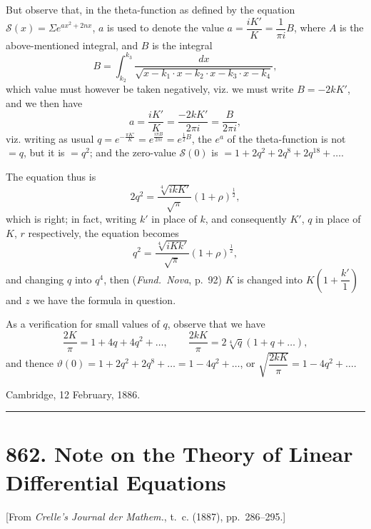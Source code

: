 \documentclass[11pt,a4paper]{article}
\theoremstyle{definition}
\begin{document}
But observe that, in the theta-function as defined by the equation $\mathcal{S}(x) = \Sigma e^{ax^2 + 2nx}$, $a$ is used to denote the value $a = \dfrac{iK'}{K} = \dfrac{1}{\pi i}B$, where $A$ is the above-mentioned integral, and $B$ is the integral
\[
B = \int_{k_2}^{k_3} \frac{dx}{\sqrt{x - k_1 \cdot x - k_2 \cdot x - k_3 \cdot x - k_4}},
\]
which value must however be taken negatively, viz. we must write $B = -2kK'$, and we then have
\[
a = \frac{iK'}{K} = \frac{-2kK'}{2\pi i} = \frac{B}{2\pi i},
\]
viz. writing as usual $q = e^{-\frac{\pi K'}{K}} = e^{\frac{i\pi B}{2\pi i}} = e^{\frac{1}{2}B}$, the $e^a$ of the theta-function is not $= q$, but it is $= q^2$; and the zero-value $\mathcal{S}(0)$ is $= 1 + 2q^2 + 2q^8 + 2q^{18} + \ldots$.

The equation thus is
\[
2q^2 = \frac{\sqrt[4]{ikK'}}{\sqrt{\pi}} (1 + \rho)^{\frac{1}{2}},
\]
which is right; in fact, writing $k'$ in place of $k$, and consequently $K'$, $q$ in place of $K$, $r$ respectively, the equation becomes
\[
q^2 = \frac{\sqrt[4]{iKk'}}{\sqrt{\pi}} (1 + \rho)^{\frac{1}{2}},
\]
and changing $q$ into $q^4$, then (\textit{Fund.~Nova}, p.~92) $K$ is changed into $K\left(1 + \dfrac{k'}{1}\right)$ and $z$ we have the formula in question.

As a verification for small values of $q$, observe that we have
\[
\frac{2K}{\pi} = 1 + 4q + 4q^2 + \ldots, \qquad \frac{2kK}{\pi} = 2\sqrt[4]{q}(1 + q + \ldots),
\]
and thence $\vartheta(0) = 1 + 2q^2 + 2q^8 + \ldots = 1 - 4q^2 + \ldots$, or $\sqrt{\dfrac{2kK}{\pi}} = 1 - 4q^2 + \ldots$.

\begin{flushright}
Cambridge, 12 February, 1886.
\end{flushright}

\vspace{12pt}
\hrule
\vspace{12pt}

\section*{862. Note on the Theory of Linear Differential Equations}

\begin{center}
[From \textit{Crelle's Journal der Mathem.}, t.~c. (1887), pp.~286--295.]
\end{center}
\end{document}

